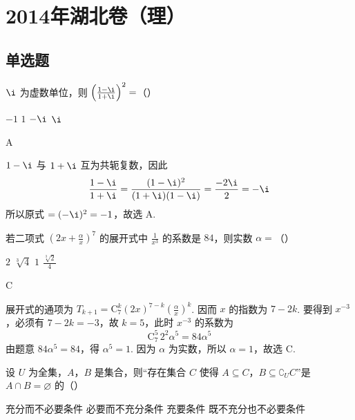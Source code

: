 
\chapter{2014年湖北卷（理）}

\section{单选题}

\begin{problem}
\(\i\) 为虚数单位，则 \(\left(\frac{1 - \i}{1 + \i}\right)^2 =\)（\quad）

\choices
    {\(-1\)}
    {\(1\)}
    {\(-\i\)}
    {\(\i\)}
\end{problem}

\begin{answer}
A
\end{answer}

\begin{solution}
\(1-\i\) 与 \(1+\i\) 互为共轭复数，因此
\[
\frac{1-\i}{1+\i}=\frac{(1-\i)^2}{(1+\i)(1-\i)}=\frac{-2\i}{2}=-\i
\]
所以原式 \(=(-\i)^2=-1\)，故选 A.
\end{solution}

\begin{problem}
若二项式 \(\left(2x + \frac{\alpha}{x}\right)^7\) 的展开式中 \(\frac{1}{x^3}\) 的系数是 \(84\)，则实数 \(\alpha =\)（\quad）

\choices
    {\(2\)}
    {\(\sqrt[3]{4}\)}
    {\(1\)}
    {\(\frac{\sqrt[3]{2}}{4}\)}
\end{problem}

\begin{answer}
C
\end{answer}

\begin{solution}
展开式的通项为 \(T_{k+1}=\mathrm C_7^k(2x)^{7-k}\left(\frac{\alpha}{x}\right)^k\). 因而 \(x\) 的指数为 \(7-2k\). 要得到 \(x^{-3}\)，必须有 \(7-2k=-3\)，故 \(k=5\)，此时 \(x^{-3}\) 的系数为
\[
\mathrm C_7^5\,2^2\alpha^5=84\alpha^5
\]
由题意 \(84\alpha^5=84\)，得 \(\alpha^5=1\). 因为 \(\alpha\) 为实数，所以 \(\alpha=1\)，故选 C.
\end{solution}

\begin{problem}
设 \(U\) 为全集，\(A\)，\(B\) 是集合，则“存在集合 \(C\) 使得 \(A \subseteq C\)，\(B \subseteq \complement_U C\)”是 \(A \cap B = \varnothing\) 的（\quad）

\choices
    {充分而不必要条件}
    {必要而不充分条件}
    {充要条件}
    {既不充分也不必要条件}
\end{problem}

